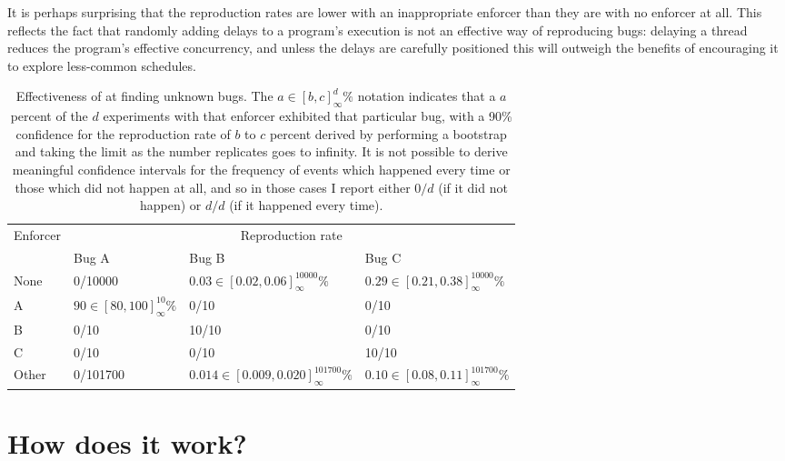 It is perhaps surprising that the reproduction rates are lower with an
inappropriate enforcer than they are with no enforcer at all.  This
reflects the fact that randomly adding delays to a program's execution
is not an effective way of reproducing bugs: delaying a thread reduces
the program's effective concurrency, and unless the delays are
carefully positioned this will outweigh the benefits of encouraging it
to explore less-common schedules.

\begin{table}
  {\hfill}
\begin{tabular}{|l|l|l|l|}
\hline
Enforcer & \multicolumn{3}{c|}{Reproduction rate} \\\cline{2-4}
         & Bug A                         & Bug B                                    & Bug C \\
\hline
None     & 0/10000                       & $0.03 \in [0.02,0.06]^{10000}_{\infty}\%$     & $0.29 \in [0.21,0.38]^{10000}_{\infty}\%$\\
\hdashline
A        & $90 \in [80,100]^{10}_{\infty}\%$ & 0/10                                     & 0/10 \\
B        & 0/10                          & 10/10                                    & 0/10 \\
C        & 0/10                          & 0/10                                     & 10/10 \\
\hdashline
Other    & 0/101700                      & $0.014 \in [0.009,0.020]^{101700}_{\infty}\%$ & $0.10 \in [0.08,0.11]^{101700}_{\infty}\%$ \\
\hline
\end{tabular}
  {\hfill}
\caption{Effectiveness of {\technique} at finding unknown bugs.  The
  $a \in [b,c]^{d}_{\infty}\%$ notation indicates that a $a$
  percent of the $d$ experiments with that enforcer exhibited that
  particular bug, with a 90\% confidence for the reproduction rate of
  $b$ to $c$ percent derived by performing a bootstrap and taking the
  limit as the number replicates goes to infinity.  It is not possible
  to derive meaningful confidence intervals for the frequency of
  events which happened every time or those which did not happen at
  all, and so in those cases I report either $0/d$ (if it did not
  happen) or $d/d$ (if it happened every time).}
\label{tab:eval:does:finding_unknown}
\end{table}

\section{How does it work?}
\label{sect:eval:how_does_it_work}

